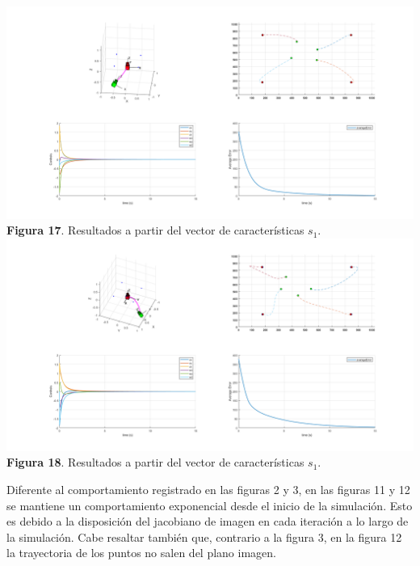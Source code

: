 \documentclass{article}
\begin{document}
	\begin{center}
		\includegraphics[scale=0.3]{fig7_1.png}\\
		{\footnotesize \textbf{Figura 17}. Resultados a partir del vector de caracter\'isticas $s_1$.}\\
		\includegraphics[scale=0.3]{fig7_2.png}\\
		{\footnotesize \textbf{Figura 18}. Resultados a partir del vector de caracter\'isticas $s_1$.}\\
	\end{center}
	
	Diferente al comportamiento registrado en las figuras 2 y 3, en las figuras 11 y 12 se mantiene un comportamiento exponencial desde el inicio de la simulaci\'on. Esto es debido a la disposici\'on del jacobiano de imagen en cada iteraci\'on a lo largo de la simulaci\'on. Cabe resaltar tambi\'en que, contrario a la figura 3, en la figura 12 la trayectoria de los puntos no salen del plano imagen.
\end{document}

